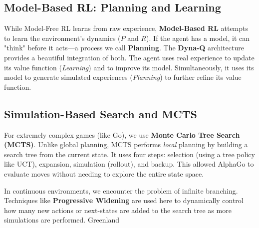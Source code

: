 \subsection{Model-Based RL: Planning and Learning}
While Model-Free RL learns from raw experience, \textbf{Model-Based RL} attempts to learn the environment's dynamics ($P$ and $R$). If the agent has a model, it can "think" before it acts—a process we call \textbf{Planning}.
The \textbf{Dyna-Q} architecture provides a beautiful integration of both. The agent uses real experience to update its value function (\textit{Learning}) and to improve its model. Simultaneously, it uses its model to generate simulated experiences (\textit{Planning}) to further refine its value function.

\subsection{Simulation-Based Search and MCTS}
For extremely complex games (like Go), we use \textbf{Monte Carlo Tree Search (MCTS)}. Unlike global planning, MCTS performs \textit{local} planning by building a search tree from the current state. It uses four steps: selection (using a tree policy like UCT), expansion, simulation (rollout), and backup. This allowed AlphaGo to evaluate moves without needing to explore the entire state space.

In continuous environments, we encounter the problem of infinite branching. Techniques like \textbf{Progressive Widening} are used here to dynamically control how many new actions or next-states are added to the search tree as more simulations are performed.
 Greenland
